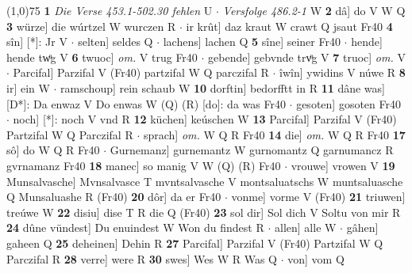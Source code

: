 \documentclass[8pt,a4paper,notitlepage]{article}
\begin{document}
\begin{table}[ht]
\begin{minipage}[t]{0.5\linewidth}
\line(1,0){75} \newline
\textbf{1} \textit{Die Verse 453.1-502.30 fehlen} U   $\cdot$ \textit{Versfolge 486.2-1} W  \textbf{2} dâ] do V W Q \textbf{3} würze] die wúrtzel W wurczen R  $\cdot$ ir krût] daz kraut W crawt Q jsaut Fr40 \textbf{4} sîn] [*]: Jr V  $\cdot$ selten] seldes Q  $\cdot$ lachens] lachen Q \textbf{5} sîne] seiner Fr40  $\cdot$ hende] hende twͦg V \textbf{6} twuoc] \textit{om.} V trug Fr40  $\cdot$ gebende] gebvnde trvͦg V \textbf{7} truoc] \textit{om.} V  $\cdot$ Parcifal] Parzifal V (Fr40) partzifal W Q parczifal R  $\cdot$ îwîn] ywidins V núwe R \textbf{8} ir] ein W  $\cdot$ ramschoup] rein schaub W \textbf{10} dorftin] bedorfftt in R \textbf{11} dâne was] [D*]: Da enwaz V Do enwas W (Q) (R) [do]: da was  Fr40  $\cdot$ gesoten] gosoten Fr40  $\cdot$ noch] [*]: noch V vnd R \textbf{12} küchen] keúschen W \textbf{13} Parcifal] Parzifal V (Fr40) Partzifal W Q Parczifal R  $\cdot$ sprach] \textit{om.} W Q R Fr40 \textbf{14} die] \textit{om.} W Q R Fr40 \textbf{17} sô] do W Q R Fr40  $\cdot$ Gurnemanz] gurnemantz W gurnomantz Q garnumancz R gvrnamanz Fr40 \textbf{18} manec] so manig V W (Q) (R) Fr40  $\cdot$ vrouwe] vrowen V \textbf{19} Munsalvasche] Mvnsalvasce T mvntsalvasche V montsaluatschs W muntsaluasche Q Munsaluashe R (Fr40) \textbf{20} dôr] da er Fr40  $\cdot$ vonme] vorme V (Fr40) \textbf{21} triuwen] treúwe W \textbf{22} disiu] dise T R die Q (Fr40) \textbf{23} sol dir] Sol dich V Soltu von mir R \textbf{24} dûne vündest] Du enuindest W Won du findest R  $\cdot$ allen] alle W  $\cdot$ gâhen] gaheen Q \textbf{25} deheinen] Dehin R \textbf{27} Parcifal] Parzifal V (Fr40) Partzifal W Q Parczifal R \textbf{28} verre] were R \textbf{30} swes] Wes W R Was Q  $\cdot$ von] vom Q \newline
\end{minipage}
\end{table}
\end{document}
